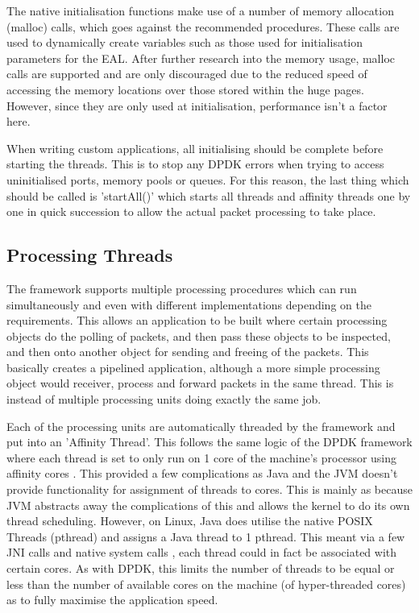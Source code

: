 \documentclass[final_report.tex]{subfiles}
\begin{document}
The native initialisation functions make use of a number of memory allocation (malloc) calls, which goes against the recommended procedures. These calls are used to dynamically create variables such as those used for initialisation parameters for the EAL. After further research into the memory usage, malloc calls are supported and are only discouraged due to the reduced speed of accessing the memory locations over those stored within the huge pages. However, since they are only used at initialisation, performance isn't a factor here.

When writing custom applications, all initialising should be complete before starting the threads. This is to stop any DPDK errors when trying to access uninitialised ports, memory pools or queues. For this reason, the last thing which should be called is 'startAll()' which starts all threads and affinity threads one by one in quick succession to allow the actual packet processing to take place.

\subsection{Processing Threads}
The framework supports multiple processing procedures which can run simultaneously and even with different implementations depending on the requirements. This allows an application to be built where certain processing objects do the polling of packets, and then pass these objects to be inspected, and then onto another object for sending and freeing of the packets. This basically creates a pipelined application, although a more simple processing object would receiver, process and forward packets in the same thread. This is instead of multiple processing units doing exactly the same job.

Each of the processing units are automatically threaded by the framework and put into an 'Affinity Thread'. This follows the same logic of the DPDK framework where each thread is set to only run on 1 core of the machine's processor using affinity cores . This provided a few complications as Java and the JVM doesn't provide functionality for assignment of threads to cores. This is mainly as because JVM abstracts away the complications of this and allows the kernel to do its own thread scheduling. However, on Linux, Java does utilise the native POSIX Threads (pthread) and assigns a Java thread to 1 pthread. This meant via a few JNI calls and native system calls , each thread could in fact be associated with certain cores. As with DPDK, this limits the number of threads to be equal or less than the number of available cores on the machine (of hyper-threaded cores) as to fully maximise the application speed.
\end{document}
